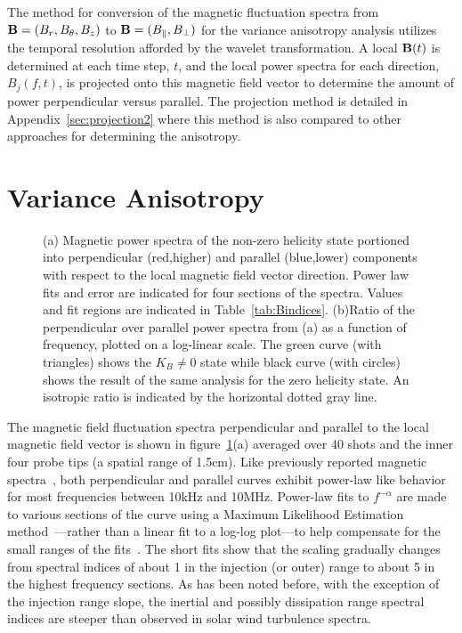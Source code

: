 \documentclass[manuscript]{aastex}
\begin{document}
The method for conversion of the magnetic fluctuation spectra from ${\bf B} = (B_{r},B_{\theta},B_{z})$ to ${\bf B} = (B_{\parallel},B_{\perp})$ for the variance anisotropy analysis utilizes the temporal resolution afforded by the wavelet transformation. A local ${\bf B}(t)$ is determined at each time step, $t$, and the local power spectra for each direction, $B_{j}(f,t)$, is projected onto this magnetic field vector to determine the amount of power perpendicular versus parallel. The projection method is detailed in Appendix~\ref{sec:projection2} where this method is also compared to other approaches for determining the anisotropy.

\section{Variance Anisotropy}\label{sec:variance}

\begin{figure}
\caption{\label{fig:spectra} (a) Magnetic power spectra of the non-zero helicity state portioned into perpendicular (red,higher) and parallel (blue,lower) components with respect to the local magnetic field vector direction. Power law fits and error are indicated for four sections of the spectra. Values and fit regions are indicated in Table~\ref{tab:Bindices}. (b)Ratio of the perpendicular over parallel power spectra from (a) as a function of frequency, plotted on a log-linear scale. The green curve (with triangles) shows the $K_{B}\neq 0$ state while black curve (with circles) shows the result of the same analysis for the zero helicity state. An isotropic ratio is indicated by the horizontal dotted gray line.}
\end{figure}

The magnetic field fluctuation spectra perpendicular and parallel to the local magnetic field vector is shown in figure~\ref{fig:spectra}(a) averaged over 40 shots and the inner four probe tips (a spatial range of 1.5cm). Like previously reported magnetic spectra~\citep{sch14a}, both perpendicular and parallel curves exhibit power-law like behavior for most frequencies between 10kHz and 10MHz. Power-law fits to $f^{-\alpha}$ are made to various sections of the curve using a Maximum Likelihood Estimation method~\citep{cla09}---rather than a linear fit to a log-log plot---to help compensate for the small ranges of the fits~\citep{dud13}. The short fits show that the scaling gradually changes from spectral indices of about 1 in the injection (or outer) range to about 5 in the highest frequency sections. As has been noted before, with the exception of the injection range slope, the inertial and possibly dissipation range spectral indices are steeper than observed in solar wind turbulence spectra.
\end{document}
